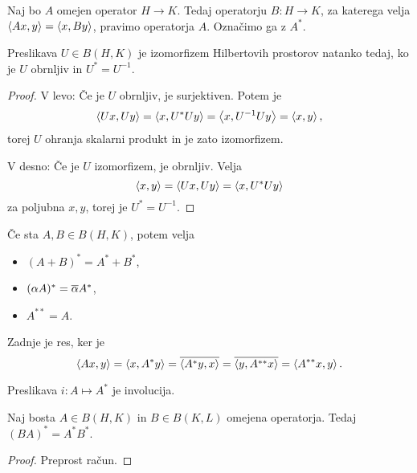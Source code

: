 
\begin{definicija}
  Naj bo $A$ omejen operator $H \to K$.
  Tedaj operatorju $B: H \to K$, za katerega velja $\left< Ax,y \right> = \left< x,By \right>$,
  pravimo  operatorja $A$.
  Označimo ga z $A^*$.
\end{definicija}

\begin{trditev}
  Preslikava $U \in B(H,K)$ je izomorfizem Hilbertovih prostorov natanko tedaj,
  ko je $U$ obrnljiv in $U^* = U^{-1}$.
\end{trditev}

\begin{proof}
  V levo:
  Če je $U$ obrnljiv, je surjektiven.
  Potem je
  \[
	\left< Ux,Uy \right> = \left< x, U^*U y \right> = \left< x, U^{-1} U y \right> = \left< x,y \right>,
  \]
  torej $U$ ohranja skalarni produkt in je zato izomorfizem.

  V desno:
  Če je $U$ izomorfizem, je obrnljiv.
  Velja
  \[
	\left< x,y \right> = \left< Ux, Uy \right> = \left< x, U^* U y \right>
  \]
  za poljubna $x, y$, torej je $U^* = U^{-1}$.
\end{proof}


\begin{opomba}
  Če sta $A, B \in B(H,K)$, potem velja
  \begin{itemize}
  \item $(A + B)^* = A^* + B^*$,
  \item $(\alpha A)^* = \overline{\alpha} A^*$,
  \item $A^{**} = A$.
  \end{itemize}
  Zadnje je res, ker je
  \[
	\left< Ax,y \right> = \left< x, A^* y \right> = \overline{\left< A^* y, x \right>} = \overline{\left< y, A^{**} x \right>} =
	\left< A^{**}x, y \right>.
  \]
\end{opomba}

\begin{opomba}
  Preslikava $i: A \mapsto A^*$ je involucija.
\end{opomba}

\begin{trditev}
  Naj bosta $A \in B(H,K)$ in $B \in B(K,L)$ omejena operatorja.
  Tedaj $(BA)^* = A^* B^*$.
\end{trditev}

\begin{proof}
  Preprost račun.
\end{proof}

